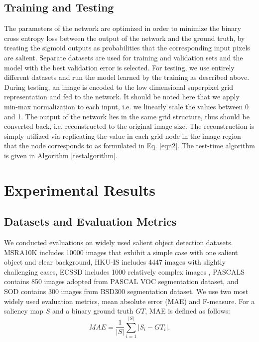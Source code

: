 \documentclass[a4paper,conference]{IEEEtran}
\begin{document}
\subsection{Training and Testing}
The parameters of the network are optimized in order to minimize the binary cross entropy loss between the output of the network and the ground truth, by treating the sigmoid outputs as probabilities that the corresponding input pixels are salient.
Separate datasets are used for training and validation sets and the model with the best validation error is selected.
For testing, we use entirely different datasets and run the model learned by the training as described above.
During testing, an image is encoded to the low dimensional superpixel grid representation and fed to the network.
It should be noted here that we apply min-max normalization to each input, i.e. we linearly scale the values between 0 and 1.
The output of the network lies in the same grid structure, thus should be converted back, i.e. reconstructed to the original image size.
The reconstruction is simply utilized via replicating the value in each grid node in the image region that the node corresponds to as formulated in Eq. \ref{eqn2}.
The test-time algorithm is given in Algorithm \ref{testalgorithm}.





\section{Experimental Results} \label{ExpRes}

\subsection{Datasets and Evaluation Metrics}
We conducted evaluations on widely used salient object detection datasets. 
MSRA10K \cite{Liu} includes 10000 images that exhibit a simple case with one salient object and clear background, HKU-IS \cite{Li4} includes 4447 images with slightly challenging cases, ECSSD \cite{Yan} includes 1000 relatively complex images , PASCALS \cite{Li6} contains 850 images adopted from PASCAL VOC segmentation dataset, and SOD \cite{Mohavedi} contains 300 images from BSD300 \cite{Martin} segmentation dataset.
We use two most widely used evaluation metrics, mean absolute error (MAE) and F-measure.
For a saliency map $S$ and a binary ground truth $GT$, MAE is defined as follows:
\begin{equation}
MAE=\frac{1}{|S|}\sum_{i=1}^{|S|}|S_i-GT_i|.
\label{eqn3}
\end{equation}
\end{document}
